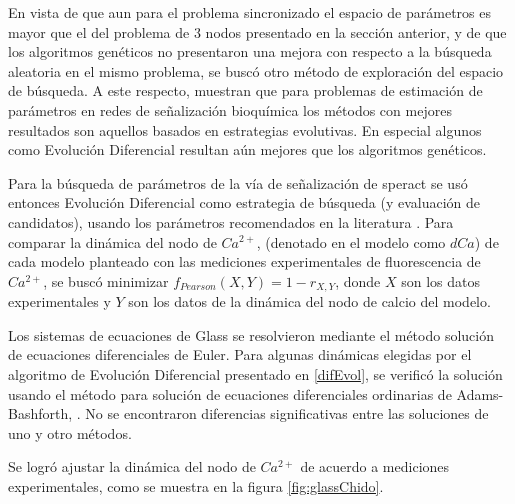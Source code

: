 En vista de que aun para el problema sincronizado el espacio de parámetros es mayor que el del problema de 3 nodos presentado en la sección anterior, y de que los algoritmos genéticos no presentaron una mejora con respecto a la búsqueda aleatoria en el mismo problema, se buscó otro método de exploración del espacio de búsqueda. A este respecto, \citeauthor{BangaMoles2003} \citep{BangaMoles2003} muestran que para problemas de estimación de parámetros en redes de señalización bioquímica los métodos con mejores resultados son aquellos basados en estrategias evolutivas. En especial algunos como Evolución Diferencial resultan aún mejores que los algoritmos genéticos.

Para la búsqueda de parámetros de la vía de señalización de speract se usó entonces Evolución Diferencial como estrategia de búsqueda (y evaluación de candidatos), usando los parámetros recomendados en la literatura \citeauthor{Storn1997}  \citep{Storn1997}. Para comparar la dinámica del nodo de $Ca^{2+}$, (denotado en el modelo como $dCa$) de cada modelo planteado con las mediciones experimentales de fluorescencia de $Ca^{2+}$, se buscó minimizar $f_{Pearson}(X,Y) = 1-r_{X,Y}$, donde $X$ son los datos experimentales y $Y$ son los datos de la dinámica del nodo de calcio del modelo. 

Los sistemas de ecuaciones de Glass se resolvieron mediante el método solución de ecuaciones diferenciales de Euler. Para algunas dinámicas elegidas por el algoritmo de Evolución Diferencial presentado en \ref{difEvol}, se verificó la solución usando el método para solución de ecuaciones diferenciales ordinarias de Adams-Bashforth, \citeauthor{gslManual} \citep{gslManual}. No se encontraron diferencias significativas entre las soluciones de uno y otro métodos.

Se logró ajustar la dinámica del nodo de $Ca^{2+}$ de acuerdo a mediciones experimentales, como se muestra en la figura \ref{fig:glassChido}. 

